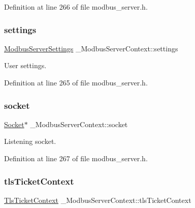 Definition at line 266 of file modbus\+\_\+server.\+h.

\mbox{\label{struct__ModbusServerContext_af265a1c5ec83119040b5cd7e0f59dfe0}} 
\subsubsection{\texorpdfstring{settings}{settings}}
{\footnotesize\ttfamily \hyperlink{structModbusServerSettings}{Modbus\+Server\+Settings} \+\_\+\+Modbus\+Server\+Context\+::settings}



User settings. 



Definition at line 265 of file modbus\+\_\+server.\+h.

\mbox{\label{struct__ModbusServerContext_a1e2a3f982100450ef100b724c3f5177d}} 
\subsubsection{\texorpdfstring{socket}{socket}}
{\footnotesize\ttfamily \hyperlink{socket_8h_aa85acfb0fa336ef495e6ba87fb88fc48}{Socket}$\ast$ \+\_\+\+Modbus\+Server\+Context\+::socket}



Listening socket. 



Definition at line 267 of file modbus\+\_\+server.\+h.

\mbox{\label{struct__ModbusServerContext_ae28db16e3bab0eb21544a24957bf7ee5}} 
\subsubsection{\texorpdfstring{tls\+Ticket\+Context}{tlsTicketContext}}
{\footnotesize\ttfamily \hyperlink{structTlsTicketContext}{Tls\+Ticket\+Context} \+\_\+\+Modbus\+Server\+Context\+::tls\+Ticket\+Context}



